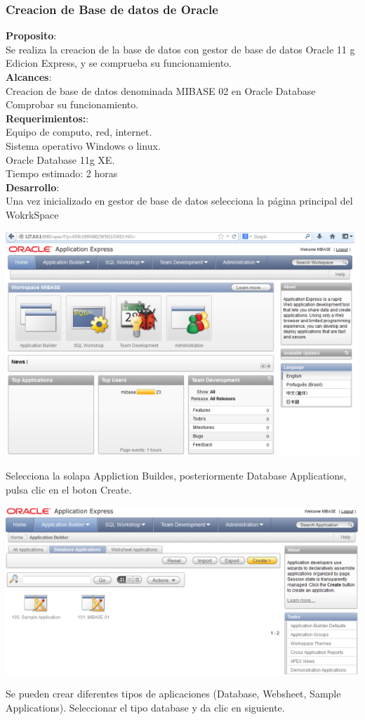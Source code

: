 \documentclass[12pt,letterpaper]{article}
\begin{document}
\subsubsection{Creacion de Base de datos de Oracle}

\textbf{Proposito}:\\
Se realiza la creacion de la base de datos con gestor de base de datos Oracle 11 g
Edicion Express, y se comprueba su funcionamiento.\\
\textbf{Alcances}:\\
Creacion de base de datos denominada MIBASE 02 en Oracle Database
Comprobar su funcionamiento.\\
\textbf{Requerimientos:}:\\
Equipo de computo, red, internet.\\
Sistema operativo Windows o linux.\\
Oracle Database 11g XE.\\
Tiempo estimado: 2 horas\\
\textbf{Desarrollo}:\\
Una vez inicializado en gestor de base de datos selecciona la página principal del
WokrkSpace

\begin{center}
\includegraphics[width=15cm]{./IMG/img10}
\end{center}
Selecciona la solapa Appliction Buildes, posteriormente Database Applications,
pulsa clic en el boton Create. 
\begin{center}
\includegraphics[width=15cm]{./IMG/img11}
\end{center}
Se pueden crear diferentes tipos de aplicaciones (Database, Websheet, Sample
Applications). Seleccionar el tipo database y da clic en siguiente.
\end{document}
